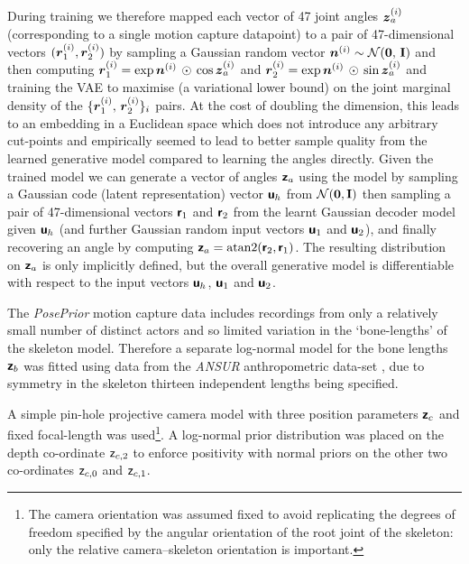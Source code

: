 During training we therefore mapped each vector of 47 joint angles $\boldsymbol{z}_a^{(i)}$ (corresponding to a single motion capture datapoint) to a pair of 47-dimensional vectors $(\boldsymbol{r}_1^{(i)},\boldsymbol{r}_2^{(i)})$ by sampling a Gaussian random vector $\vct{n}^{(i)} \sim \nrm{\vct{0},\,\idmtx}$ and then computing $\boldsymbol{r}_1^{(i)} = \exp\boldsymbol{n}^{(i)}\,\odot\,\cos\boldsymbol{z}_a^{(i)}$ and $ \boldsymbol{r}^{(i)}_2 = \exp\boldsymbol{n}^{(i)}\,\odot\,\sin\boldsymbol{z}^{(i)}_a$ and training the \ac{VAE} to maximise (a variational lower bound) on the joint marginal density of the $\lbrace \boldsymbol{r}^{(i)}_1,\,\boldsymbol{r}^{(i)}_2\rbrace_i$ pairs. At the cost of doubling the dimension, this leads to an embedding in a Euclidean space which does not introduce any arbitrary cut-points and empirically seemed to lead to better sample quality from the learned generative model compared to learning the angles directly. Given the trained model we can generate a vector of angles $\boldsymbol{\mathsf{z}}_a$ using the model by sampling a Gaussian code (latent representation) vector $\boldsymbol{\mathsf{u}}_h$ from $\nrm{\vct{0},\idmtx}$ then sampling a pair of 47-dimensional vectors $\boldsymbol{\mathsf{r}}_1$ and $\boldsymbol{\mathsf{r}}_2$ from the learnt Gaussian decoder model given $\boldsymbol{\mathsf{u}}_h$ (and further Gaussian random input vectors $\boldsymbol{\mathsf{u}}_1$ and $\boldsymbol{\mathsf{u}}_2$), and finally recovering an angle by computing $\boldsymbol{\mathsf{z}}_a = \textrm{atan2}(\boldsymbol{\mathsf{r}}_2,\boldsymbol{\mathsf{r}}_1)$. The resulting distribution on $\boldsymbol{\mathsf{z}}_a$ is only implicitly defined, but the overall generative model is differentiable with respect to the input vectors $\boldsymbol{\mathsf{u}}_h$, $\boldsymbol{\mathsf{u}}_1$ and $\boldsymbol{\mathsf{u}}_2$.

The \emph{PosePrior} motion capture data includes recordings from only a relatively small number of distinct actors and so limited variation in the `bone-lengths' of the skeleton model. Therefore a separate log-normal model for the bone lengths $\boldsymbol{\mathsf{z}}_b$ was fitted using data from the \emph{ANSUR} anthropometric data-set \citep{gordon1988ansur}, due to symmetry in the skeleton thirteen independent lengths being specified. 

A simple pin-hole projective camera model with three position parameters $\boldsymbol{\mathsf{z}}_c$ and fixed focal-length was used\footnote{The camera orientation was assumed fixed to avoid replicating the degrees of freedom specified by the angular orientation of the root joint of the skeleton: only the relative camera--skeleton orientation is important.}. A log-normal prior distribution was placed on the depth co-ordinate $\mathsf{z}_{c,2}$ to enforce positivity with normal priors on the other two co-ordinates $\mathsf{z}_{c,0}$ and $\mathsf{z}_{c,1}$. 

